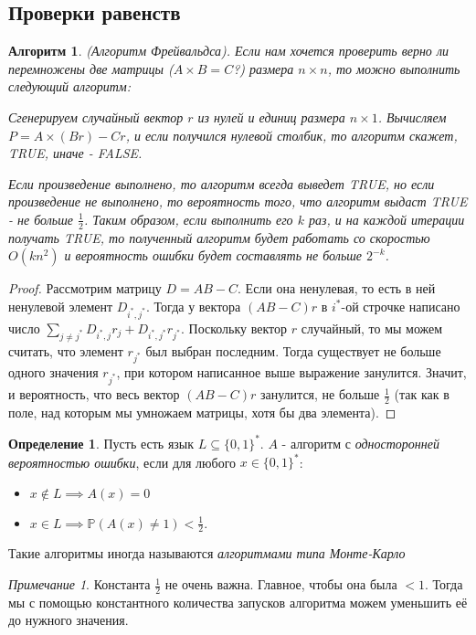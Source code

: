 \documentclass[a4paper]{article}
\theoremstyle{indented}
\newtheorem{alg}{Алгоритм}
\theoremstyle{definition}
\newtheorem{defn}{Определение}
\theoremstyle{remark}
\newtheorem{remark}{Примечание}
\begin{document}
\subsection{Проверки равенств}

\begin{alg}
(Алгоритм Фрейвальдса). Если нам хочется проверить верно ли перемножены две матрицы ($A\times B = C$?) размера $n \times n$, то можно выполнить следующий алгоритм: \ 

Сгенерируем случайный вектор $r$ из нулей и единиц размера $n \times 1$. Вычисляем $P = A \times (B r) - Cr$, и если получился нулевой столбик, то алгоритм скажет, TRUE, иначе - FALSE. \ 

Если произведение выполнено, то алгоритм всегда выведет TRUE, но если произведение не выполнено, то вероятность того, что алгоритм выдаст TRUE - не больше $\frac{1}{2}$. Таким образом, если выполнить его $k$ раз, и на каждой итерации получать TRUE, то полученный алгоритм будет работать со скоростью $O(kn^2)$ и вероятность ошибки будет составлять не больше $2^{-k}$.
\end{alg} 
\begin{proof}
Рассмотрим матрицу $D=AB-C$. Если она ненулевая, то есть в ней ненулевой элемент $D_{i^*, j^*}$. Тогда у вектора $(AB-C)r$ в $i^*$-ой строчке написано число $\sum_{j \neq j^*} D_{i^*, j}r_{j} + D_{i^*, j^*}r_{j^*}$. Поскольку вектор $r$ случайный, то мы можем считать, что элемент $r_{j^*}$ был выбран последним. Тогда существует не больше одного значения $r_{j^*}$, при котором написанное выше выражение занулится. Значит, и вероятность, что весь вектор $(AB-C)r$ занулится, не больше $\frac{1}{2}$ (так как в поле, над которым мы умножаем матрицы, хотя бы два элемента).
\end{proof}

\begin{defn}
Пусть есть язык $L \subseteq \{0, 1\}^*$. $A$ - алгоритм с \textit{односторонней вероятностью ошибки}, если для любого $x \in \{0, 1\}^*$:
\begin{itemize}
\item $x \notin L \implies A(x)=0$
\item $x \in L \implies \mathbb{P}(A(x) \neq 1) <\frac{1}{2}$.
\end{itemize}
Такие алгоритмы иногда называются \textit{алгоритмами типа Монте-Карло}
\end{defn}
\begin{remark}
Константа $\frac{1}{2}$ не очень важна. Главное, чтобы она была $<1$. Тогда мы с помощью константного количества запусков алгоритма можем уменьшить её до нужного значения.
\end{remark}
\end{document}

